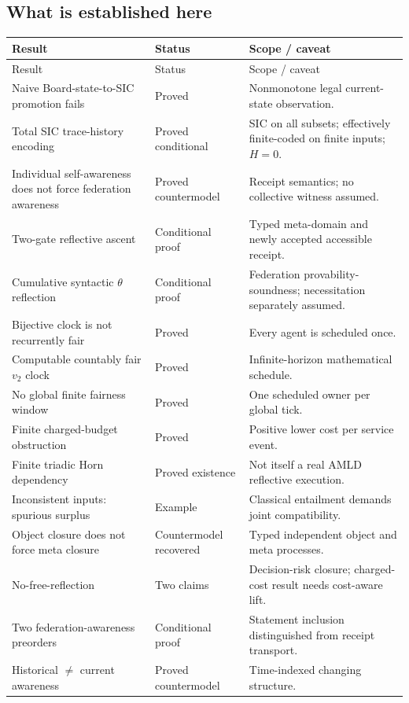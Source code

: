 \documentclass[10pt,letterpaper]{article}
\theoremstyle{remark}\newtheorem{remark}[definition]{Remark}
\begin{document}
\subsection{What is established here}
\begin{longtable}{@{}p{}p{}p{}@{}}
\toprule Result & Status & Scope / caveat\\\midrule\endfirsthead
\toprule Result & Status & Scope / caveat\\\midrule\endhead
Naive Board-state-to-SIC promotion fails & Proved & Nonmonotone legal current-state observation.\\
Total SIC trace-history encoding & Proved conditional & SIC on all subsets; effectively finite-coded on finite inputs; $H=0$.\\
Individual self-awareness does not force federation awareness & Proved countermodel & Receipt semantics; no collective witness assumed.\\
Two-gate reflective ascent & Conditional proof & Typed meta-domain and newly accepted accessible receipt.\\
Cumulative syntactic $\theta$ reflection & Conditional proof & Federation provability-soundness; necessitation separately assumed.\\
Bijective clock is not recurrently fair & Proved & Every agent is scheduled once.\\
Computable countably fair $v_2$ clock & Proved & Infinite-horizon mathematical schedule.\\
No global finite fairness window & Proved & One scheduled owner per global tick.\\
Finite charged-budget obstruction & Proved & Positive lower cost per service event.\\
Finite triadic Horn dependency & Proved existence & Not itself a real AMLD reflective execution.\\
Inconsistent inputs: spurious surplus & Example & Classical entailment demands joint compatibility.\\
Object closure does not force meta closure & Countermodel recovered & Typed independent object and meta processes.\\
No-free-reflection & Two claims & Decision-risk closure; charged-cost result needs cost-aware lift.\\
Two federation-awareness preorders & Conditional proof & Statement inclusion distinguished from receipt transport.\\
Historical $\neq$ current awareness & Proved countermodel & Time-indexed changing structure.\\\bottomrule
\end{longtable}
\end{document}
